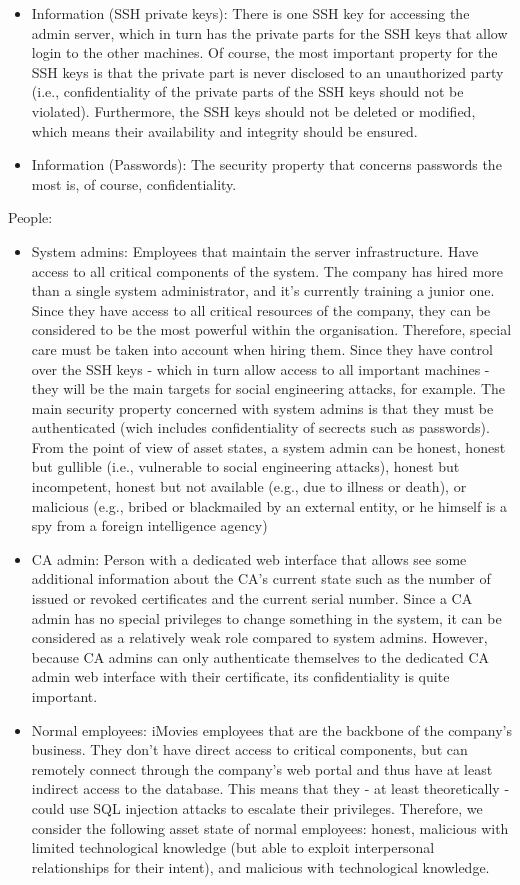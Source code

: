 \documentclass[english]{article}
\begin{document}
\begin{itemize}
    \item Information (SSH private keys): There is one SSH key for accessing the admin server, which in turn has the private parts for the SSH keys that allow login to the other machines. Of course, the most important property for the SSH keys is that the private part is never disclosed to an unauthorized party (i.e., confidentiality of the private parts of the SSH keys should not be violated). Furthermore, the SSH keys should not be deleted or modified, which means their availability and integrity should be ensured.
    \item Information (Passwords): The security property that concerns passwords the most is, of course, confidentiality.
	\end{itemize}


	People:
	\begin{itemize}

    \item System admins: Employees that maintain the server infrastructure. Have access to all critical components of the system. The company has hired more than a single system administrator, and it's currently training a junior one. Since they have access to all critical resources of the company, they can be considered to be the most powerful within the organisation. Therefore, special care must be taken into account when hiring them. Since they have control over the SSH keys - which in turn allow access to all important machines - they will be the main targets for social engineering attacks, for example. The main security property concerned with system admins is that they must be authenticated (wich includes confidentiality of secrects such as passwords). From the point of view of asset states, a system admin can be honest, honest but gullible (i.e., vulnerable to social engineering attacks), honest but incompetent, honest but not available (e.g., due to illness or death), or malicious (e.g., bribed or blackmailed by an external entity, or he himself is a spy from a foreign intelligence agency)
	\item CA admin: Person with a dedicated web interface that allows see some additional information about the CA's current state such as the number of issued or revoked certificates and the current serial number. Since a CA admin has no special privileges to change something in the system, it can be considered as a relatively weak role compared to system admins. However, because CA admins can only authenticate themselves to the dedicated CA admin web interface with their certificate, its confidentiality is quite important.
  \item Normal employees: iMovies employees that are the backbone of the company's business. They don't have direct access to critical components, but can remotely connect through the company's web portal and thus have at least indirect access to the database. This means that they - at least theoretically - could use SQL injection attacks to escalate their privileges. Therefore, we consider the following asset state of normal employees: honest, malicious with limited technological knowledge (but able to exploit interpersonal relationships for their intent), and malicious with technological knowledge.


\end{itemize}
\end{document}
